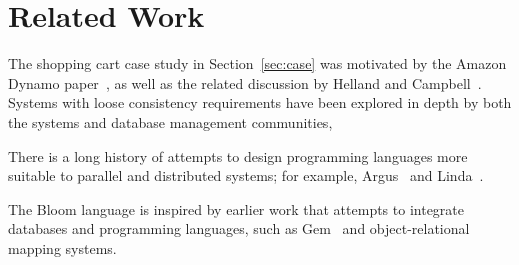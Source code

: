\section{Related Work}
\label{sec:relwork}
The shopping cart case study in Section~\ref{sec:case} was motivated by the
Amazon Dynamo paper~\cite{dynamo}, as well as the related discussion by Helland
and Campbell~\cite{quicksand}. Systems with loose consistency requirements have
been explored in depth by both the systems and database management communities,

There is a long history of attempts to design programming languages more
suitable to parallel and distributed systems; for example, Argus~\cite{argus}
and Linda~\cite{linda}.

The Bloom language is inspired by earlier work that attempts to integrate
databases and programming languages, such as Gem~\cite{gem} and
object-relational mapping systems.
